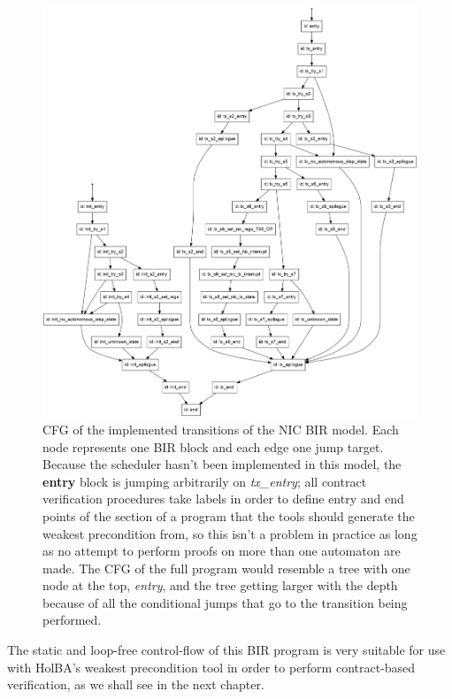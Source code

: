 \documentclass{kththesis}
\begin{document}
{\begin{figure}[p]
	\includegraphics[width=\textwidth]{figures/nic-bir-model-cfg.png}
	\centering
	\caption{\gls{CFG} of the implemented transitions of the NIC BIR model. Each node represents one BIR block and each edge one jump target. Because the scheduler hasn't been implemented in this model, the \textbf{entry} block is jumping arbitrarily on \textit{tx\_entry}; all contract verification procedures take labels in order to define entry and end points of the section of a program that the tools should generate the weakest precondition from, so this isn't a problem in practice as long as no attempt to perform proofs on more than one automaton are made. The CFG of the full program would resemble a tree with one node at the top, \textit{entry}, and the tree getting larger with the depth because of all the conditional jumps that go to the transition being performed.}
	\label{nic-bir-model-cfg}
\end{figure}

The static and loop-free control-flow of this BIR program is very suitable for use with HolBA's weakest precondition tool in order to perform contract-based verification, as we shall see in the next chapter.


}
\end{document}
